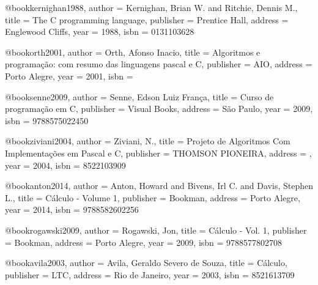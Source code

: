 @book{kernighan1988,
  author = {Kernighan, Brian W. and Ritchie, Dennis M.},
  title = {The C programming language},
  publisher = {Prentice Hall},
  address = {Englewood Cliffs},
  year = {1988},
  isbn = {0131103628}
}

@book{orth2001,
  author = {Orth, Afonso Inacio},
  title = {Algoritmos e programação: com resumo das linguagens pascal e C},
  publisher = {AIO},
  address = {Porto Alegre},
  year = {2001},
  isbn = {}
}

@book{senne2009,
  author = {Senne, Edson Luiz França},
  title = {Curso de programação em C},
  publisher = {Visual Books},
  address = {São Paulo},
  year = {2009},
  isbn = {9788575022450}
}

@book{ziviani2004,
  author = {Ziviani, N.},
  title = {Projeto de Algoritmos Com Implementações em Pascal e C},
  publisher = {THOMSON PIONEIRA},
  address = {},
  year = {2004},
  isbn = {8522103909}
}

%

@book{anton2014,
  author = {Anton, Howard and Bivens, Irl C. and Davis, Stephen L.},
  title = {Cálculo - Volume 1},
  publisher = {Bookman},
  address = {Porto Alegre},
  year = {2014},
  isbn = {9788582602256}
}

@book{rogawski2009,
  author = {Rogawski, Jon},
  title = {Cálculo - Vol. 1},
  publisher = {Bookman},
  address = {Porto Alegre},
  year = {2009},
  isbn = {9788577802708}
}

@book{avila2003,
  author = {Avila, Geraldo Severo de Souza},
  title = {Cálculo},
  publisher = {LTC},
  address = {Rio de Janeiro},
  year = {2003}, %
  isbn = {8521613709}%
}

